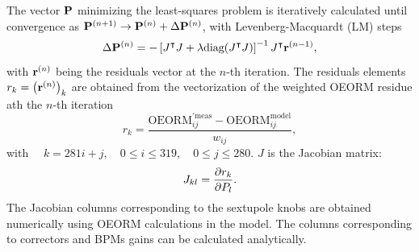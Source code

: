\documentclass[%
               ]{jacow}
\begin{document}
The vector $\vb{P}$ minimizing the least-squares problem is iteratively calculated until convergence as $\vb{P}^{(n+1)}\to \vb{P}^{(n)} + \Delta \vb{P}^{(n)}$, with Levenberg-Macquardt (LM) steps 
\begin{equation}
\Delta \vb{P}^{(n)} = - \left[J^{\intercal}J  + \lambda \text{diag}(J^{\intercal}J) \right]^{-1} J^\intercal \vb{r}^{(n-1)},
\label{eq:GN}
\end{equation}
with $\vb{r}^{(n)}$ being the residuals vector at the $n$-th iteration. The residuals elements $r_k = \left(\vb{r}^{(n)}\right)_k$ are obtained from the vectorization of the weighted OEORM residue ath the $n$-th iteration
    \begin{equation}
    r_{k} = \frac{\text{OEORM}_{ij}^{\prime\text{meas}}- \text{OEORM}_{ij}^{\text{model}}}{w_{ij  }},
    \end{equation}
with $\quad k = 281 i + j, \quad 0\leq i\leq 319, \quad 0\leq j\leq 280$. $J$ is the Jacobian matrix: 
\begin{equation}
J_{kl} = \pdv{r_k}{P_l}.
\end{equation}
The Jacobian columns corresponding to the sextupole knobs are obtained numerically using OEORM calculations in the model. The columns corresponding to correctors and BPMs gains can be calculated analytically.
\end{document}
